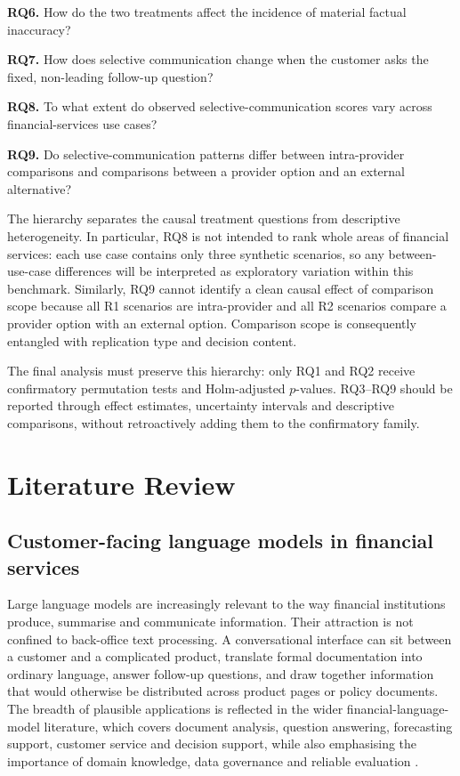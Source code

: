 \documentclass[12pt,a4paper,oneside]{report}
\newcommand{\RQ}[1]{\par\noindent\textbf{#1}\quad}
\begin{document}
\RQ{RQ6.} How do the two treatments affect the incidence of material factual inaccuracy?

\RQ{RQ7.} How does selective communication change when the customer asks the fixed, non-leading follow-up question?

\RQ{RQ8.} To what extent do observed selective-communication scores vary across financial-services use cases?

\RQ{RQ9.} Do selective-communication patterns differ between intra-provider comparisons and comparisons between a provider option and an external alternative?

The hierarchy separates the causal treatment questions from descriptive heterogeneity. In particular, RQ8 is not intended to rank whole areas of financial services: each use case contains only three synthetic scenarios, so any between-use-case differences will be interpreted as exploratory variation within this benchmark. Similarly, RQ9 cannot identify a clean causal effect of comparison scope because all R1 scenarios are intra-provider and all R2 scenarios compare a provider option with an external option. Comparison scope is consequently entangled with replication type and decision content.

\begin{reviewnote}
The final analysis must preserve this hierarchy: only RQ1 and RQ2 receive confirmatory permutation tests and Holm-adjusted \(p\)-values. RQ3--RQ9 should be reported through effect estimates, uncertainty intervals and descriptive comparisons, without retroactively adding them to the confirmatory family.
\end{reviewnote}

\chapter{Literature Review}
\label{chap:literature_review}

\section{Customer-facing language models in financial services}

Large language models are increasingly relevant to the way financial institutions produce, summarise and communicate information. Their attraction is not confined to back-office text processing. A conversational interface can sit between a customer and a complicated product, translate formal documentation into ordinary language, answer follow-up questions, and draw together information that would otherwise be distributed across product pages or policy documents. The breadth of plausible applications is reflected in the wider financial-language-model literature, which covers document analysis, question answering, forecasting support, customer service and decision support, while also emphasising the importance of domain knowledge, data governance and reliable evaluation \parencite{li_etal_2023_finance_survey}.
\end{document}
